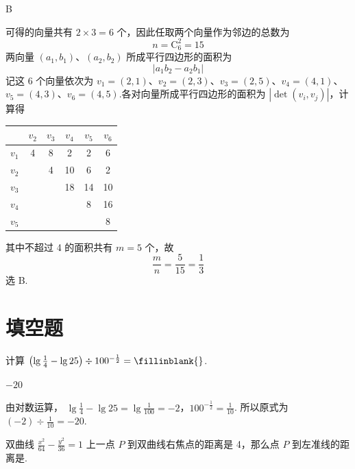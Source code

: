 \begin{answer}
B
\end{answer}

\begin{solution}
可得的向量共有 \(2\times3=6\) 个，因此任取两个向量作为邻边的总数为
\[
n=\mathrm C_6^2=15
\]
两向量 \((a_1,b_1)\)、\((a_2,b_2)\) 所成平行四边形的面积为
\[
\left|a_1b_2-a_2b_1\right|
\]
记这 6 个向量依次为 \(v_1=(2,1)\)、\(v_2=(2,3)\)、\(v_3=(2,5)\)、\(v_4=(4,1)\)、\(v_5=(4,3)\)、\(v_6=(4,5)\).各对向量所成平行四边形的面积为 \(\left|\det(v_i,v_j)\right|\)，计算得
\begin{center}
\begin{tabular}{c|ccccc}
 & \(v_2\) & \(v_3\) & \(v_4\) & \(v_5\) & \(v_6\)\\ \hline
\(v_1\) & 4 & 8 & 2 & 2 & 6\\
\(v_2\) &  & 4 & 10 & 6 & 2\\
\(v_3\) &  &  & 18 & 14 & 10\\
\(v_4\) &  &  &  & 8 & 16\\
\(v_5\) &  &  &  &  & 8
\end{tabular}
\end{center}

其中不超过 4 的面积共有 \(m=5\) 个，故
\[
\frac{m}{n}=\frac{5}{15}=\frac13
\]
选 B.
\end{solution}

\section{填空题}

\begin{problem}
计算 \(\left(\lg \frac{1}{4} - \lg 25\right) \div 100^{-\frac{1}{2}} =\fillinblank{}\).
\end{problem}

\begin{answer}
\(-20\)
\end{answer}

\begin{solution}
由对数运算，
\(\lg\frac14-\lg25=\lg\frac{1}{100}=-2\)，\(100^{-\frac12}=\frac{1}{10}\).
所以原式为 \((-2)\div\frac{1}{10}=-20\).
\end{solution}

\begin{problem}
双曲线 \(\frac{x^2}{64} - \frac{y^2}{36} = 1\) 上一点 \(P\) 到双曲线右焦点的距离是 4，那么点 \(P\) 到左准线的距离是\fillinblank{}.
\end{problem}

